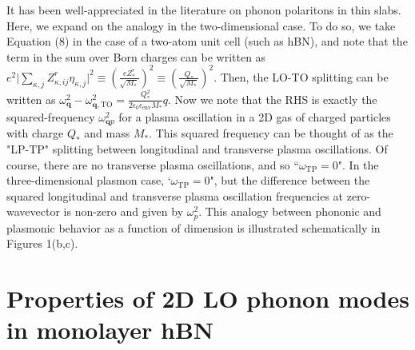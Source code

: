\documentclass[aps,prb,twocolumn,
groupedaddress,superscriptaddress,
amsfonts,amssymb,amsmath,floatfix,
citeautoscript]{revtex4-1}
\begin{document}
	It has been well-appreciated in the literature on phonon polaritons in thin slabs. Here, we expand on the analogy in the two-dimensional case. To do so, we take Equation (8) in the case of a two-atom unit cell (such as hBN), and note that the term in the sum over Born charges can be written as $e^2\Big|\sum\limits_{\kappa,j}Z^r_{\kappa,ij}\eta_{\kappa,j}  \Big|^2 \equiv  \left(\frac{eZ^r_*}{\sqrt{M_*}}\right)^2 \equiv \left(\frac{Q_*}{\sqrt{M_*}}\right)^2$. Then, the LO-TO splitting can be written as $\omega^2_{\mathbf{q}} - \omega^2_{\mathbf{q},\mathrm{TO}} = \frac{Q_*^2}{2\epsilon_0\epsilon_{\mathrm{env}} M_*}q$. Now we note that the RHS is exactly the squared-frequency $\omega^2_{\mathbf{q}p}$ for a plasma oscillation in a 2D gas of charged particles with charge $Q_*$ and mass $M_*$. This squared frequency can be thought of as the "LP-TP" splitting between longitudinal and transverse plasma oscillations. Of course, there are no transverse plasma oscillations, and so ``$\omega_{\mathrm{TP}} = 0$". In the three-dimensional plasmon case, `$\omega_{\mathrm{TP}} = 0$", but the difference between the squared longitudinal and transverse plasma oscillation frequencies at zero-wavevector is non-zero and given by $\omega_p^2$. This analogy between phononic and plasmonic behavior as a function of dimension is illustrated schematically in Figures 1(b,c).
	
	\section{Properties of 2D LO phonon modes in monolayer hBN}
	
\end{document}
